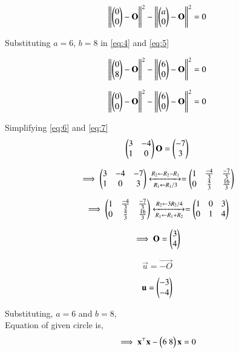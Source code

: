 \documentclass[journal,12pt,twocolumn]{IEEEtran}
\begin{document}
\begin{equation}
\left\lVert {\ensuremath{\begin{pmatrix}0\\0\end{pmatrix}}-\mathbf{O}}\right\rVert^2 - \left\lVert {\ensuremath{\begin{pmatrix}a\\0\end{pmatrix}}-\mathbf{O}}\right\rVert^2= 0 \label{eq:5}
\end{equation}

Substituting $a=6$, $b=8$ in \ref{eq:4} and \ref{eq:5}

\begin{equation}
     \left\lVert {\ensuremath{\begin{pmatrix}0\\8\end{pmatrix}}-\mathbf{O}}\right\rVert^2 - \left\lVert {\ensuremath{\begin{pmatrix}6\\0\end{pmatrix}}-\mathbf{O}}\right\rVert^2= 0 \label{eq:6}
\end{equation}

\begin{equation}
\left\lVert {\ensuremath{\begin{pmatrix}0\\0\end{pmatrix}}-\mathbf{O}}\right\rVert^2 - \left\lVert {\ensuremath{\begin{pmatrix}6\\0\end{pmatrix}}-\mathbf{O}}\right\rVert^2= 0 \label{eq:7}
\end{equation}

Simplifying \ref{eq:6} and \ref{eq:7}
\begin{equation}
    \begin{pmatrix}3 & -4 \\ 1 & 0\end{pmatrix}\mathbf{O}= \begin{pmatrix}-7 \\ 3\end{pmatrix}
\end{equation}



\begin{equation}
\implies \begin{pmatrix}3 & -4 & -7 \\ 1 & 0 & 3\end{pmatrix}
\xleftrightarrow [R_1\leftarrow R_1/3]{R_2\leftarrow R_2-R_1}
=
\begin{pmatrix}1 & \frac{-4}{3} & \frac{-7}{3} \\ 0& \frac{4}{3} & \frac{16}{3}\end{pmatrix}
\end{equation}


\begin{equation}
  \implies \begin{pmatrix}1 & \frac{-4}{3} & \frac{-7}{3} \\ 0& \frac{4}{3} & \frac{16}{3}\end{pmatrix}
  \xleftrightarrow [R_1\leftarrow R_1+R_2]{R_2\leftarrow 3R_2/4}
=
\begin{pmatrix}1 & 0 & 3 \\ 0& 1 & 4\end{pmatrix}
\end{equation}


\begin{equation}
    \implies \mathbf{O}=\begin{pmatrix}3 \\ 4\end{pmatrix} 
\end{equation}

\begin{equation}
    \vec{u} = \vec{-O}
\end{equation}

\begin{equation}
    \mathbf{u} = \begin{pmatrix}-3\\-4\end{pmatrix}
\end{equation}

Substituting, $a=6$ and $b=8$,\\
Equation of given circle is,
\begin{equation}
   \implies \mathbf{x^\top}\mathbf{x}-\begin{pmatrix}6 \ 8 \end{pmatrix}\mathbf{x}=0
\end{equation}
\end{document}
